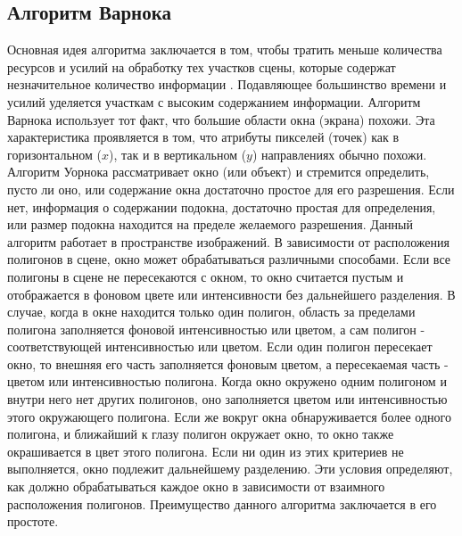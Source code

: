 \subsection{Алгоритм Варнока}
Основная идея алгоритма заключается в том, чтобы тратить меньше количества ресурсов и усилий на обработку тех участков сцены, которые содержат незначительное количество информации \cite{math_cg}. Подавляющее большинство времени и усилий уделяется участкам с высоким содержанием информации. Алгоритм Варнока использует тот факт, что большие области окна (экрана) похожи. Эта характеристика проявляется в том, что атрибуты пикселей (точек) как в горизонтальном ($x$), так и в вертикальном ($y$) направлениях обычно похожи. Алгоритм Уорнока рассматривает окно (или объект) и стремится определить, пусто ли оно, или содержание окна достаточно простое для его разрешения. Если нет, информация о содержании подокна, достаточно простая для определения, или размер подокна находится на пределе желаемого разрешения.
Данный алгоритм работает в пространстве изображений. В зависимости от расположения полигонов в сцене, окно может обрабатываться различными способами. Если все полигоны в сцене не пересекаются с окном, то окно считается пустым и отображается в фоновом цвете или интенсивности без дальнейшего разделения. В случае, когда в окне находится только один полигон, область за пределами полигона заполняется фоновой интенсивностью или цветом, а сам полигон - соответствующей интенсивностью или цветом. Если один полигон пересекает окно, то внешняя его часть заполняется фоновым цветом, а пересекаемая часть - цветом или интенсивностью полигона. Когда окно окружено одним полигоном и внутри него нет других полигонов, оно заполняется цветом или интенсивностью этого окружающего полигона. Если же вокруг окна обнаруживается более одного полигона, и ближайший к глазу полигон окружает окно, то окно также окрашивается в цвет этого полигона. Если ни один из этих критериев не выполняется, окно подлежит дальнейшему разделению. Эти условия определяют, как должно обрабатываться каждое окно в зависимости от взаимного расположения полигонов. Преимущество данного алгоритма заключается в его простоте.


